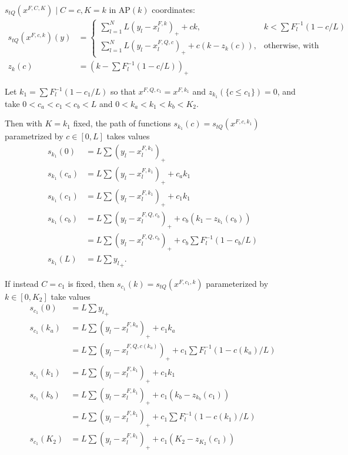 \documentclass{article}
\begin{document}
$s_{tQ}(x^{F,C,K}) \mid C = c, K = k$ in $\mathrm{AP}(k)$ coordinates:
\begin{align}
s_{tQ}(x^{F,c,k})(y) &= 
\begin{cases}
\sum_{l=1}^{N}L(y_l - x_l^{F,k})_{+} + ck, & k < \sum F_l^{-1}(1-c/L) \\
\sum_{l=1}^{N}L(y_l - x_l^{F,Q,c})_{+} + c(k - z_k(c)), & \text{otherwise, with } 
\end{cases} \\
z_k(c) &= (k -  \sum F_l^{-1}(1-c/L))_{+}
\end{align}

Let $k_1 = \sum F_l^{-1}(1-c_1/L)$ so that $x^{F,Q,c_1} = x^{F, k_1}$ and $z_{k_1}(\{c \leq c_1\}) = 0$, and take $0<c_a < c_1 < c_b < L$ and $0 < k_a < k_1 < k_b < K_2$.

Then with $K = k_1$ fixed, the path of functions $s_{k_1}(c) = s_{tQ}(x^{F,c,k_1})$ parametrized by $c \in [0,L]$ takes values
\begin{align}
s_{k_1}(0)  &= L\sum ( y_l-x_l^{F,k_1})_{+}  \\
s_{k_1}(c_a)  &= L\sum ( y_l-x_l^{F,k_1})_{+} + c_a k_1\\
s_{k_1}(c_1) &= L\sum (y_l - x_l^{F,k_1})_{+} + c_1 k_1  \\
s_{k_1}(c_b) &= L\sum (y_l - x_l^{F,Q, c_b})_{+} + c_b(k_1 - z_{k_1}(c_b)) \\
&= L\sum (y_l - x_l^{F,Q, c_b})_{+} + c_b \sum F_l^{-1}(1-c_b/L)\\
s_{k_1}(L)  &= L\sum {y_l}_{+}.
\end{align}

If instead $C = c_1$ is fixed, then $s_{c_1}(k) = s_{tQ}(x^{F,c_1,k})$ parameterized by 
$k \in [0,K_2]$ take values
\begin{align}
s_{c_1}(0) & = L \sum {y_l}_{+} \\
s_{c_1}(k_a) & = L \sum (y_l - x_l^{F,k_a})_{+} + c_1 k_a\\
& = L \sum (y_l - x_l^{F,Q,c(k_a)})_{+} + c_1 \sum F_l^{-1}(1-c(k_a)/L)\\
s_{c_1}(k_1) & = L \sum (y_l - x_l^{F,k_1})_{+} + c_1 k_1 \\
s_{c_1}(k_b) & = L \sum (y_l - x_l^{F,k_1})_{+} + c_1 (k_b - z_{k_b}(c_1)) \\
 & = L \sum (y_l - x_l^{F,k_1})_{+} + c_1 \sum F_l^{-1}(1-c(k_1)/L)\\
s_{c_1}(K_2) & = L \sum (y_l - x_l^{F,k_1})_{+} + c_1 (K_2 - z_{K_2}(c_1))
\end{align}
\end{document}
